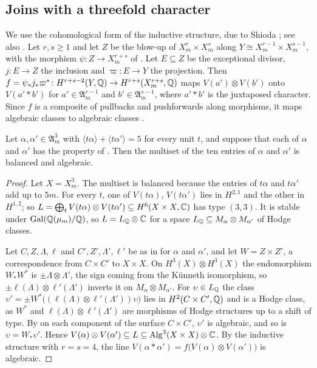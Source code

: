 \subsection{Joins with a threefold character}\label{ssec:join}
We use the cohomological form of the inductive structure, due to Shioda
\cite[Theorem~II]{Shi79}; see also \cite{SK79}. Let $r,s\ge1$ and let $Z$ be
the blow-up of $X^{r}_{m}\times X^{s}_{m}$ along $Y\cong X^{r-1}_{m}\times
X^{s-1}_{m}$, with the morphism $\psi\colon Z\to X^{r+s}_{m}$ of
. Let $E\subseteq Z$ be the exceptional divisor, $j\colon E\to
Z$ the inclusion and $\varpi\colon E\to Y$ the projection. Then
$f=\psi_{*}j_{*}\varpi^{*}\colon H^{r+s-2}(Y,\mathbb{Q})\to H^{r+s}(X^{r+s}_{m},\mathbb{Q})$
maps $V(a')\otimes V(b')$ onto $V(a'*b')$ for $a'\in\mathfrak A^{r-1}_{m}$
and $b'\in\mathfrak A^{s-1}_{m}$, where $a'*b'$ is the juxtaposed character.
Since $f$ is a composite of pullbacks and pushforwards along morphisms, it
maps algebraic classes to algebraic classes \cite[Chapter~19]{Ful98}.

\begin{proposition}\label{prop:join}
Let $\alpha,\alpha'\in\mathfrak A^{3}_{m}$ with $\langle t\alpha\rangle+
\langle t\alpha'\rangle=5$ for every unit $t$, and suppose that each of
$\alpha$ and $\alpha'$ has the property of . Then the
multiset of the ten entries of $\alpha$ and $\alpha'$ is balanced and
algebraic.
\end{proposition}

\begin{proof}
Let $X=X^{3}_{m}$. The multiset is balanced because the entries of $t\alpha$
and $t\alpha'$ add up to $5m$. For every $t$, one of $V(t\alpha)$,
$V(t\alpha')$ lies in $H^{2,1}$ and the other in $H^{1,2}$; so $L=
\bigoplus_{t}V(t\alpha)\otimes V(t\alpha')\subseteq H^{6}(X\times X,\mathbb{C})$ has
type $(3,3)$. It is stable under $\operatorname{Gal}(\mathbb{Q}(\mu_{m})/\mathbb{Q})$, so
$L=L_{\mathbb{Q}}\otimes\mathbb{C}$ for a space $L_{\mathbb{Q}}\subseteq M_{\alpha}\otimes
M_{\alpha'}$ of Hodge classes.

Let $C,Z,\Lambda,\ell$ and $C',Z',\Lambda',\ell'$ be as in
 for $\alpha$ and $\alpha'$, and let $W=Z\times Z'$, a
correspondence from $C\times C'$ to $X\times X$. On $H^{3}(X)\otimes
H^{3}(X)$ the endomorphism $W_{*}W^{*}$ is $\pm\Lambda\otimes\Lambda'$, the
sign coming from the K\"unneth isomorphism, so $\pm\ell(\Lambda)\otimes
\ell'(\Lambda')$ inverts it on $M_{\alpha}\otimes M_{\alpha'}$. For
$\upsilon\in L_{\mathbb{Q}}$ the class $\upsilon'=\pm W^{*}\bigl((\ell(\Lambda)
\otimes\ell'(\Lambda'))\upsilon\bigr)$ lies in $H^{2}(C\times C',\mathbb{Q})$ and is
a Hodge class, as $W^{*}$ and $\ell(\Lambda)\otimes\ell'(\Lambda')$ are
morphisms of Hodge structures up to a shift of type. By
 on each component of the surface $C\times C'$,
$\upsilon'$ is algebraic, and so is $\upsilon=W_{*}\upsilon'$. Hence
$V(\alpha)\otimes V(\alpha')\subseteq L\subseteq\operatorname{Alg}^{3}(X\times X)\otimes
\mathbb{C}$. By the inductive structure with $r=s=4$, the line $V(\alpha*\alpha')=
f\bigl(V(\alpha)\otimes V(\alpha')\bigr)$ is algebraic.
\end{proof}

